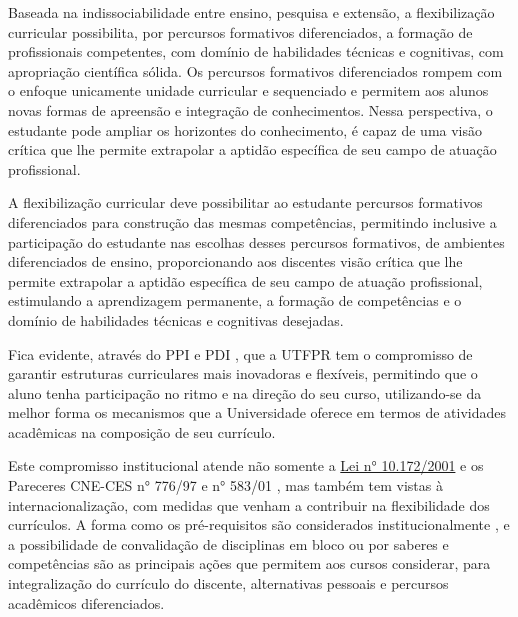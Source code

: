 Baseada na indissociabilidade entre ensino, pesquisa e extensão, a flexibilização curricular possibilita, por percursos formativos diferenciados, a formação de profissionais competentes, com domínio de habilidades técnicas e cognitivas, com apropriação científica sólida. Os percursos formativos diferenciados rompem com o enfoque unicamente unidade curricular e sequenciado e permitem aos alunos novas formas de apreensão e integração de conhecimentos. Nessa perspectiva, o estudante pode ampliar os horizontes do conhecimento, é capaz de uma visão crítica que lhe permite extrapolar a aptidão específica de seu campo de atuação profissional.

A flexibilização curricular deve possibilitar ao estudante percursos formativos diferenciados para construção das mesmas competências, permitindo inclusive a participação do estudante nas escolhas desses percursos formativos, de ambientes diferenciados de ensino, proporcionando aos discentes visão crítica que lhe permite extrapolar a aptidão específica de seu campo de atuação profissional, estimulando a aprendizagem permanente, a formação de competências e o domínio de habilidades técnicas e cognitivas desejadas.


Fica evidente, através do PPI \cite{ppiutfpr} e PDI \cite{pdiutfpr}, que a UTFPR tem o compromisso de garantir estruturas curriculares mais inovadoras e flexíveis, permitindo que o aluno tenha participação no ritmo e na direção do seu curso, utilizando-se da melhor forma os mecanismos que a Universidade oferece em termos de atividades acadêmicas na composição de seu currículo.

Este compromisso institucional atende não somente a \href{http://www.planalto.gov.br/ccivil_03/leis/leis_2001/l10172.htm}{Lei n° 10.172/2001} \cite{Lei:10172:2001} e os Pareceres CNE-CES n° 776/97 \cite{parecer776} e n° 583/01 \cite{parecer583}, mas também tem vistas à internacionalização, com medidas que venham a contribuir na flexibilidade dos currículos. A forma como os pré-requisitos são considerados institucionalmente , e a possibilidade de convalidação de disciplinas em bloco ou por saberes e competências são as principais ações que permitem aos cursos considerar, para integralização do currículo do discente, alternativas pessoais e percursos acadêmicos diferenciados.

